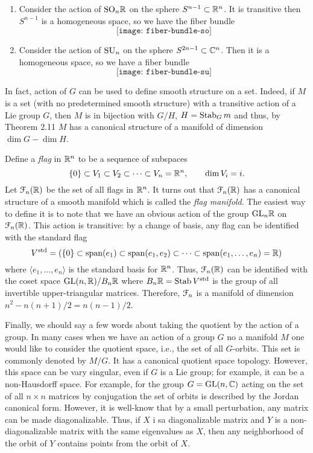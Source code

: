 \begin{enumerate}[label=(\arabic*)]
\item Consider the action of $\mathrm{SO}_n\mathbb{R}$ on the sphere
  $S^{n-1}\subset\mathbb{R}^n$. It is transitive then $S^{n-1}$ is a homogeneous
  space, so we have the fiber bundle
  \[
    \texttt{[image: fiber-bundle-so]}
  \]
\item Consider the action of $\mathrm{SU}_n$ on the sphere
  $S^{2n-1}\subset\mathbb{C}^n$. Then it is a homogeneous space, so we have a
  fiber bundle
  \[
    \texttt{[image: fiber-bundle-su]}
  \]
\end{enumerate}

In fact, action of $G$ can be used to define smooth structure on a
set. Indeed, if $M$ is a set (with no predetermined smooth structure) with
a transitive action of a Lie group $G$, then $M$ is in bijection with
$G/H$, $H=\operatorname{Stab}_G m$ and thus, by Theorem 2.11 $M$ has a canonical
structure of a manifold of dimension $\dim G-\dim H$.

\begin{example}
  Define a \emph{flag} in $\mathbb{R}^n$ to be a sequence of subspaces
  \[
    \{0\}\subset V_1\subset V_2\subset\dotsb\subset V_n=\mathbb{R}^n,\qquad \dim
    V_i=i.
  \]
  Let $\mathcal{F}_n(\mathbb{R})$ be the set of all flags in $\mathbb{R}^n$. It turns out
  that $\mathcal{F}_n(\mathbb{R})$ has a canonical structure of a smooth manifold which
  is called the \emph{flag manifold}. The easiest way to define it is to
  note that we have an obvious action of the group ${\mathrm{GL}_n}\mathbb{R}$ on
  $\mathcal{F}_n(\mathbb{R})$. This action is transitive: by a change of basis, any
  flag can be identified with the standard flag
  \[
    V^{\text{std}}=\left( \{0\}\subset\operatorname{span}(e_1
      )\subset\operatorname{span}(e_1,e_2
      )\subset\cdots\subset\operatorname{span}(e_1,\dotsc,e_n )=\mathbb{R}\right)
  \]
  where $\langle e_1,\dots,e_n \rangle$ is the standard basis for
  $\mathbb{R}^n$. Thus, $\mathcal{F}_n(\mathbb{R})$ can be identified with the coset space
  $\mathrm{GL}(n,\mathbb{R})/B_n\mathbb{R}$ where $B_n\mathbb{R}=\operatorname{Stab} V^{\text{std}}$ is the group
  of all invertible upper-triangular matrices. Therefore, $\mathcal{F}_n$ is a
  manifold of dimension $n^2-n(n+1)/2=n(n-1)/2$.
\end{example}

Finally, we should say a few words about taking the quotient by the action
of a group. In many cases when we have an action of a group $G$ no a
manifold $M$ one would like to consider the quotient space, i.e., the set
of all $G$-orbits. This set is commonly denoted by $M/G$. It has a
canonical quotient space topology. However, this space can be vary
singular, even if $G$ is a Lie group; for example, it can be a
non-Hausdorff space. For example, for the group $G=\mathrm{GL}(n,\mathbb{C})$ acting on
the set of all $n\times n$ matrices by conjugation the set of orbits is
described by the Jordan canonical form. However, it is well-know that by a
small perturbation, any matrix can be made diagonalizable. Thus, if $X$ i
sa diagonalizable matrix and $Y$ is a non-diagonalizable matrix with the
same eigenvalues as $X$, then any neighborhood of the orbit of $Y$ contains
points from the orbit of $X$.


